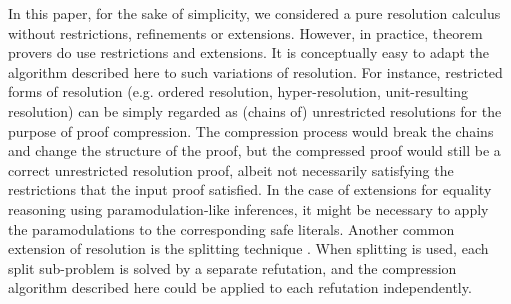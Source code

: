 In this paper, for the sake of simplicity, we considered a pure resolution calculus without restrictions, refinements or extensions. However, in practice, theorem provers do use restrictions and extensions. It is conceptually easy to adapt the algorithm described here to such variations of resolution. For instance, restricted forms of resolution (e.g. ordered resolution, hyper-resolution, unit-resulting resolution) can be simply regarded as (chains of) unrestricted resolutions for the purpose of proof compression. The compression process would break the chains and change the structure of the proof, but the compressed proof would still be a correct unrestricted resolution proof, albeit not necessarily satisfying the restrictions that the input proof satisfied. In the case of extensions for equality reasoning using paramodulation-like inferences, it might be necessary to apply the paramodulations to the corresponding safe literals. Another common extension of resolution is the splitting technique \cite{TODO}. When splitting is used, each split sub-problem is solved by a separate refutation, and the compression algorithm described here could be applied to each refutation independently.








